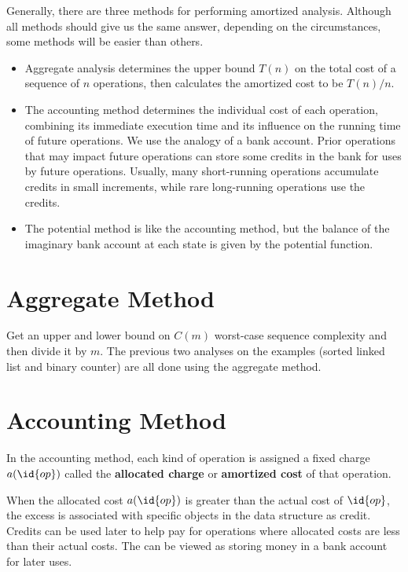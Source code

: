 Generally, there are three methods for performing amortized analysis. Although all methods should give us the same answer, depending on the circumstances, some methods will be easier than others.

\begin{itemize}
    \item Aggregate analysis determines the upper bound $T(n)$ on the total cost of a sequence of $n$
    operations, then calculates the amortized cost to be $T(n) / n$.
    \item The accounting method determines the individual cost of each operation, combining its immediate execution time and its influence on the running time of future operations. We use the analogy of a bank account. Prior operations that may impact future operations can store some credits in the bank for uses by future operations. Usually, many short-running operations accumulate credits in small increments, while rare long-running operations use the credits.
    \item The potential method is like the accounting method, but the balance of the imaginary bank account at each state is given by the potential function.
\end{itemize}

\section{Aggregate Method} 

Get an upper and lower bound on $C(m)$ worst-case sequence complexity and then divide it by $m$. The previous two analyses on the examples (sorted linked list and binary counter) are all done using the aggregate method.

\section{Accounting Method}   

In the accounting method, each kind of operation is assigned a fixed charge $a(\id{op})$ called the \textbf{allocated charge} or \textbf{amortized cost} of that operation.  

When the allocated cost $a(\id{op})$ is greater than the actual cost of $\id{op}$, the excess is associated with specific objects in the data structure as credit. Credits can be used later to help pay for operations where allocated costs are less than their actual costs. The can be viewed as storing money in a bank account for later uses.

